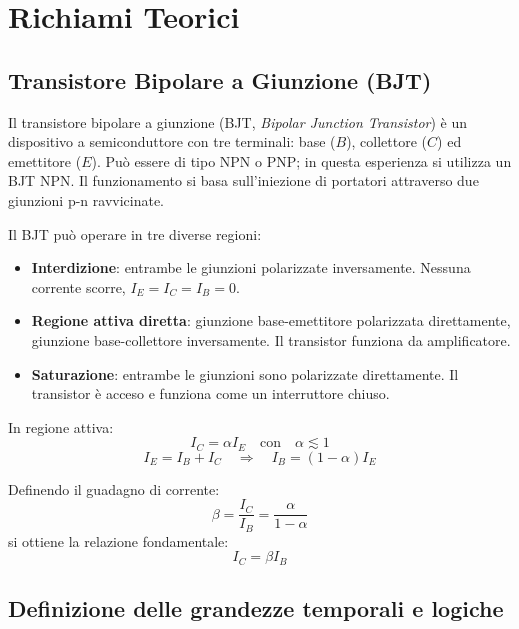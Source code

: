 \documentclass[a4paper,12pt]{article}
\begin{document}
\section{Richiami Teorici}

\subsection{Transistore Bipolare a Giunzione (BJT)}

Il transistore bipolare a giunzione (BJT, \textit{Bipolar Junction Transistor}) è un dispositivo a semiconduttore con tre terminali: base (\(B\)), collettore (\(C\)) ed emettitore (\(E\)). Può essere di tipo NPN o PNP; in questa esperienza si utilizza un BJT NPN. Il funzionamento si basa sull'iniezione di portatori attraverso due giunzioni p-n ravvicinate.

Il BJT può operare in tre diverse regioni:
\begin{itemize}
    \item \textbf{Interdizione}: entrambe le giunzioni polarizzate inversamente. Nessuna corrente scorre, \(I_E = I_C = I_B = 0\).
    \item \textbf{Regione attiva diretta}: giunzione base-emettitore polarizzata direttamente, giunzione base-collettore inversamente. Il transistor funziona da amplificatore.
    \item \textbf{Saturazione}: entrambe le giunzioni sono polarizzate direttamente. Il transistor è acceso e funziona come un interruttore chiuso.
\end{itemize}

In regione attiva:
\begin{equation}
    I_C = \alpha I_E \quad \text{con} \quad \alpha \lesssim 1
\end{equation}
\begin{equation}
    I_E = I_B + I_C \quad \Rightarrow \quad I_B = (1 - \alpha) I_E
\end{equation}

Definendo il guadagno di corrente:
\begin{equation}
    \beta = \frac{I_C}{I_B} = \frac{\alpha}{1 - \alpha}
\end{equation}
\noindent si ottiene la relazione fondamentale:
\begin{equation}
    I_C = \beta I_B
\end{equation}
\subsection*{Definizione delle grandezze temporali e logiche}
\end{document}
